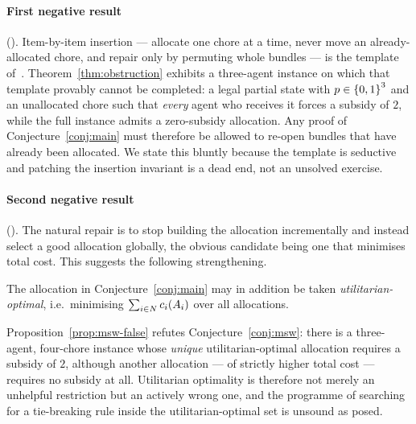 \paragraph{First negative result} ().
Item-by-item insertion --- allocate one chore at a time, never move an
already-allocated chore, and repair only by permuting whole bundles --- is the
template of~\cite{BKNS22}. Theorem~\ref{thm:obstruction} exhibits a three-agent
instance on which that template provably cannot be completed: a legal partial
state with $p \in \left\{0,1\right\}^3$ and an unallocated chore such that
\emph{every} agent who receives it forces a subsidy of $2$, while the full
instance admits a zero-subsidy allocation. Any proof of
Conjecture~\ref{conj:main} must therefore be allowed to re-open bundles that
have already been allocated. We state this bluntly because the template is
seductive and patching the insertion invariant is a dead end, not an unsolved
exercise.

\paragraph{Second negative result} ().
The natural repair is to stop building the allocation incrementally and instead
select a good allocation globally, the obvious candidate being one that
minimises total cost. This suggests the following strengthening.

\begin{conjecture}
\label{conj:msw}
The allocation in Conjecture~\ref{conj:main} may in addition be taken
\emph{utilitarian-optimal}, i.e.\ minimising $\sum_{i \in N}
c_i(A_{i})$ over all allocations.
\end{conjecture}

Proposition~\ref{prop:msw-false} refutes Conjecture~\ref{conj:msw}: there is a
three-agent, four-chore instance whose \emph{unique} utilitarian-optimal
allocation requires a subsidy of $2$, although another allocation --- of
strictly higher total cost --- requires no subsidy at all. Utilitarian
optimality is therefore not merely an unhelpful restriction but an actively
wrong one, and the programme of searching for a tie-breaking rule inside the
utilitarian-optimal set is unsound as posed.

